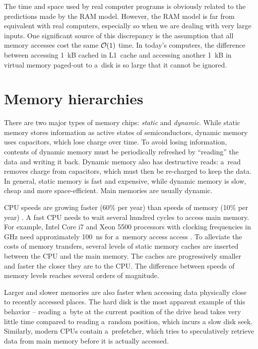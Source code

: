 The time and space used by real computer programs is obviously related
to the predictions made by the RAM model. However, the RAM model is far
from equivalent with real computers, especially so when we are dealing with
very large inputs. One significant source of this discrepancy is the assumption
that all memory accesses cost the same $\mathcal{O}(1)$ time. In today's computers,
the difference between accessing 1~kB cached in L1~cache and accessing
another 1~kB in virtual memory paged-out to a~disk is so large that it cannot
be ignored.

\section{Memory hierarchies}
There are two major types of memory chips: \emph{static} and \emph{dynamic}.
While static memory stores information as active states of semiconductors,
dynamic memory uses capacitors, which lose charge over time. To avoid losing
information, contents of dynamic memory must be periodically refreshed by
``reading'' the data and writing it back. Dynamic memory also has destructive
reads: a~read removes charge from capacitors, which must then be re-charged
to keep the data. In general, static memory is fast and expensive, while dynamic
memory is slow, cheap and more space-efficient. Main memories are usually
dynamic.

CPU speeds are growing faster (60\% per year) than speeds of memory (10\% per
year) \cite{Ailamaki:2004:DAN:1316689.1316801}.
A fast CPU needs to wait several hundred cycles to access main memory.
For example, Intel Core i7 and Xeon 5500 processors with clocking frequencies
in GHz need approximately 100~ns for a~memory access
access \cite{perf-analysis-guide}.
To alleviate the costs of memory transfers, several levels of static memory
caches are inserted between the CPU and the main memory. The caches are
progressively smaller and faster the closer they are to the CPU. The difference
between speeds of memory levels reaches several orders of magnitude.

Larger and slower memories are also faster when accessing data physically
close to recently accessed places. The hard disk is the most apparent example
of this behavior -- reading a~byte at the current position of the drive
head takes very little time compared to reading a~random position, which incurs
a slow disk seek. %
Similarly, modern CPUs contain a~prefetcher, which tries to speculatively
retrieve data from main memory before it is actually accessed.

